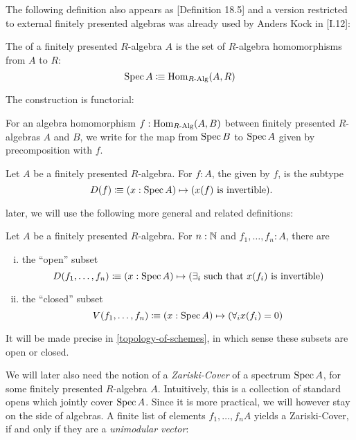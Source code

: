 The following definition also appears as \cite{ingo-thesis}[Definition 18.5]
and a version restricted to external finitely presented algebras was already used by Anders Kock in \cite{kock-sdg}[I.12]:

\begin{definition}
  \label{spec}
  The  of a finitely presented $R$-algebra $A$
  is the set of $R$-algebra homomorphisms from $A$ to $R$:
  \[ \operatorname{Spec} A \vcentcolon\mspace{-1.2mu}\equiv \mathrm{Hom}_{R\text{-}\mathrm{Alg}}(A, R) \]
\end{definition}

The construction is functorial:

\begin{definition}
  \label{spec-on-maps}
  For an algebra homomorphism $f:\mathrm{Hom}_{R\text{-}\mathrm{Alg}}(A,B)$
  between finitely presented $R$-algebras $A$ and $B$,
  we write  for the map from $\operatorname{Spec} B$ to $\operatorname{Spec} A$
  given by precomposition with $f$.
\end{definition}

\begin{definition}%
  \label{standard-open-subset}
  Let $A$ be a finitely presented $R$-algebra.
  For $f:A$, the  given by $f$,
  is the subtype 
  \[
    D(f)\colonequiv (x:\Spec A)\mapsto (x(f)\text{ is invertible})
    \rlap{.}
  \]
\end{definition}

later, we will use the following more general and related definitions:

\begin{definition}
  \label{open-closed-affine-subsets}
  Let $A$ be a finitely presented $R$-algebra.
  For $n:\mathbb{N}$ and $f_1,\dots,f_n:A$, there are
  \begin{enumerate}[(i)]
  \item the ``open'' subset
    \[
      D(f_1,\dots,f_n)\vcentcolon\mspace{-1.2mu}\equiv (x:\operatorname{Spec} A)\mapsto (\text{$\exists_i$ such that $x(f_i)$ is invertible})
    \]  
  \item the ``closed'' subset
    \[
      V(f_1,\dots,f_n)\vcentcolon\mspace{-1.2mu}\equiv (x:\operatorname{Spec} A)\mapsto (\forall_i x(f_i)=0)
    \]  
  \end{enumerate}
  It will be made precise in \cref{topology-of-schemes}, in which sense these subsets are open or closed.
\end{definition}

We will later also need the notion of a \emph{Zariski-Cover} of a spectrum $\operatorname{Spec} A$,
for some finitely presented $R$-algebra $A$.
Intuitively, this is a collection of standard opens which jointly cover $\operatorname{Spec} A$.
Since it is more practical, we will however stay on the side of algebras.
A finite list of elements $f_1,\dots,f_nA$ yields a Zariski-Cover,
if and only if they are a \emph{unimodular vector}:

